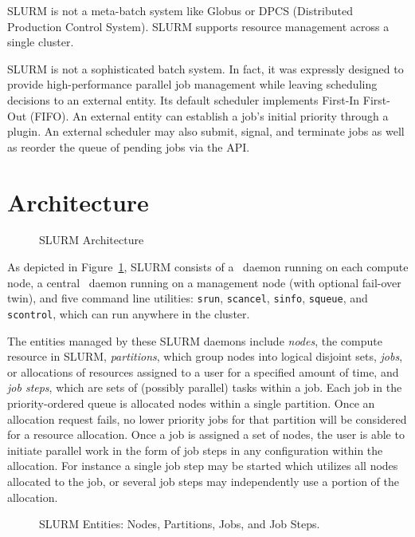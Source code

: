 \documentclass[10pt,onecolumn,times]{../common/llncs}
\begin{document}
{SLURM is not a meta-batch system like Globus\cite{Globus2002} or DPCS
(Distributed Production Control System)\cite{DPCS2002}.  SLURM supports
resource management across a single cluster.

SLURM is not a sophisticated batch system.  In fact, it was expressly
designed to provide high-performance parallel job management while
leaving scheduling decisions to an external entity.  Its default scheduler
implements First-In First-Out (FIFO).  An external entity can establish
a job's initial priority through a plugin.  An external scheduler may
also submit, signal, and terminate jobs as well as reorder the queue of
pending jobs via the API.


\section{Architecture}

\begin{figure}[tb]
\centerline{}
\caption{\small SLURM Architecture}
\label{arch}
\end{figure}

As depicted in Figure~\ref{arch}, SLURM consists of a \slurmd\ daemon
running on each compute node, a central \slurmctld\ daemon running
on a management node (with optional fail-over twin), and five command
line utilities: {\tt srun}, {\tt scancel}, {\tt sinfo}, {\tt squeue},
and {\tt scontrol}, which can run anywhere in the cluster.

The entities managed by these SLURM daemons include {\em nodes}, the
compute resource in SLURM, {\em partitions}, which group nodes into
logical disjoint sets, {\em jobs}, or allocations of resources assigned
to a user for a specified amount of time, and {\em job steps}, which
are sets of (possibly parallel) tasks within a job.  Each job in the
priority-ordered queue is allocated nodes within a single partition.
Once an allocation request fails, no lower priority jobs for that
partition will be considered for a resource allocation.  Once a job is
assigned a set of nodes, the user is able to initiate parallel work in
the form of job steps in any configuration within the allocation. For
instance a single job step may be started which utilizes all nodes
allocated to the job, or several job steps may independently use a
portion of the allocation.

\begin{figure}[tcb]
\centerline{}
\caption{\small SLURM Entities: Nodes, Partitions, Jobs, and Job Steps.}
\label{entities}
\end{figure}

}
\end{document}
